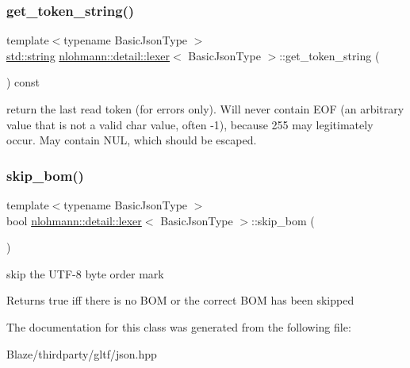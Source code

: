 \subsubsection{\texorpdfstring{get\+\_\+token\+\_\+string()}{get\_token\_string()}}
{\footnotesize\ttfamily template$<$typename Basic\+Json\+Type $>$ \\
\hyperlink{namespacenlohmann_1_1detail_a1ed8fc6239da25abcaf681d30ace4985ab45cffe084dd3d20d928bee85e7b0f21}{std\+::string} \hyperlink{classnlohmann_1_1detail_1_1lexer}{nlohmann\+::detail\+::lexer}$<$ Basic\+Json\+Type $>$\+::get\+\_\+token\+\_\+string (\begin{DoxyParamCaption}{ }\end{DoxyParamCaption}) const\hspace{0.3cm}{\ttfamily [inline]}}

return the last read token (for errors only). Will never contain E\+OF (an arbitrary value that is not a valid char value, often -\/1), because 255 may legitimately occur. May contain N\+UL, which should be escaped. \mbox{\label{classnlohmann_1_1detail_1_1lexer_a709afd52def2e258dac0b8a67dc4ea26}} 
\subsubsection{\texorpdfstring{skip\+\_\+bom()}{skip\_bom()}}
{\footnotesize\ttfamily template$<$typename Basic\+Json\+Type $>$ \\
bool \hyperlink{classnlohmann_1_1detail_1_1lexer}{nlohmann\+::detail\+::lexer}$<$ Basic\+Json\+Type $>$\+::skip\+\_\+bom (\begin{DoxyParamCaption}{ }\end{DoxyParamCaption})\hspace{0.3cm}{\ttfamily [inline]}}



skip the U\+T\+F-\/8 byte order mark 

\begin{DoxyReturn}{Returns}
true iff there is no B\+OM or the correct B\+OM has been skipped 
\end{DoxyReturn}


The documentation for this class was generated from the following file\+:\begin{DoxyCompactItemize}
\item 
Blaze/thirdparty/gltf/json.\+hpp\end{DoxyCompactItemize}

